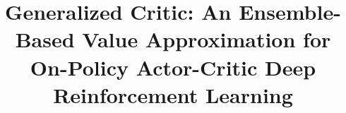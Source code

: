 \documentclass[review]{elsarticle}
\begin{document}
\begin{frontmatter}

\title{Generalized Critic: An Ensemble-Based Value Approximation for On-Policy Actor-Critic Deep Reinforcement Learning}







\end{frontmatter}



%










\end{document}
